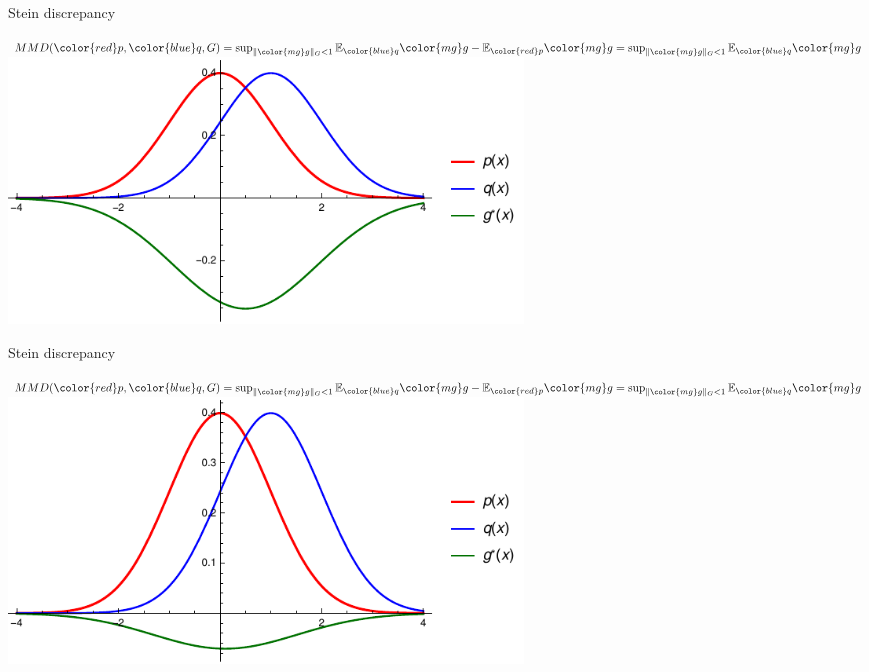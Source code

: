 \documentclass{beamer}
\begin{document}
  
 \begin{frame}{Stein discrepancy}
 \begin{center}
 
$MMD({\color{red} p},{ \color{blue} q},G) = \sup_{   \| {\color{mg} g} \|_G<1} \ev_{{ \color{blue} q}}{\color{mg}g} - \ev_{{\color{red} p}} {\color{mg}g}  = \sup_{ \| {\color{mg} g} \|_G<1} \ev_{{ \color{blue} q}} {\color{mg}g} $  \\
\vspace{0.5cm}
\includegraphics[width=0.6\textwidth]{./img/s05.pdf} 
 \end{center}
 \end{frame} 
 
 
 \begin{frame}{Stein discrepancy}
 \begin{center}
 
$MMD({\color{red} p},{ \color{blue} q},G) = \sup_{   \| {\color{mg} g} \|_G<1} \ev_{{ \color{blue} q}}{\color{mg}g} - \ev_{{\color{red} p}} {\color{mg}g}  = \sup_{ \| {\color{mg} g} \|_G<1} \ev_{{ \color{blue} q}} {\color{mg}g} $  \\
\vspace{0.5cm}
 \includegraphics[width=0.6\textwidth]{./img/s01.pdf} 
 \end{center}
 \end{frame} 
\end{document}
